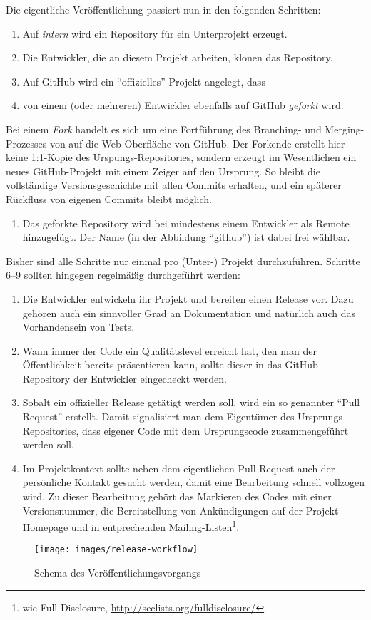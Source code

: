 Die eigentliche Veröffentlichung passiert nun in den folgenden Schritten:

\begin{enumerate}
  \item Auf \textit{intern} wird ein Repository für ein Unterprojekt erzeugt.
  \item Die Entwickler, die an diesem Projekt arbeiten, klonen das Repository.
  \item Auf GitHub wird ein \enquote{offizielles} Projekt angelegt, dass
  \item von einem (oder mehreren) Entwickler ebenfalls auf GitHub \textit{geforkt}
      wird.
\end{enumerate}

Bei einem \textit{Fork} handelt es sich um eine Fortführung des Branching- und
Merging-Prozesses von  auf die Web-Oberfläche von GitHub. Der Forkende
erstellt hier keine 1:1-Kopie des Urspungs-Repositories, sondern erzeugt im
Wesentlichen ein neues GitHub-Projekt mit einem Zeiger auf den Ursprung. So
bleibt die vollständige Versionsgeschichte mit allen Commits erhalten, und ein
späterer Rückfluss von eigenen Commits bleibt möglich.

\begin{enumerate}[resume]
  \item Das geforkte Repository wird bei mindestens einem Entwickler als Remote
      hinzugefügt. Der Name (in der Abbildung \enquote{github}) ist dabei frei
      wählbar.
\end{enumerate}

Bisher sind alle Schritte nur einmal pro (Unter-) Projekt durchzuführen. Schritte
6--9 sollten hingegen regelmäßig durchgeführt werden:

\begin{enumerate}[resume]
  \item Die Entwickler entwickeln ihr Projekt und bereiten einen Release vor.
      Dazu gehören auch ein sinnvoller Grad an Dokumentation und natürlich auch
      das Vorhandensein von Tests.
  \item Wann immer der Code ein Qualitätslevel erreicht hat, den man der
      Öffentlichkeit bereits präsentieren kann, sollte dieser in das
      GitHub-Repository der Entwickler eingecheckt werden.
  \item Sobalt ein offizieller Release getätigt werden soll, wird ein so genannter
      \enquote{Pull Request} erstellt. Damit signalisiert man dem Eigentümer
      des Ursprungs-Repositories, dass eigener Code mit dem Ursprungscode
      zusammengeführt werden soll.
  \item Im Projektkontext sollte neben dem eigentlichen Pull-Request auch der
      persönliche Kontakt gesucht werden, damit eine Bearbeitung schnell vollzogen
      wird. Zu dieser Bearbeitung gehört das Markieren des Codes mit einer
      Versionsnummer, die Bereitstellung von Ankündigungen auf der Projekt-Homepage
      und in entprechenden Mailing-Listen\footnote{wie Full Disclosure,
      \url{http://seclists.org/fulldisclosure/}}.
\end{enumerate}


\begin{figure}
  \texttt{[image: images/release-workflow]}
  \caption{Schema des Veröffentlichungsvorgangs}
  \label{fig:release}
\end{figure}

